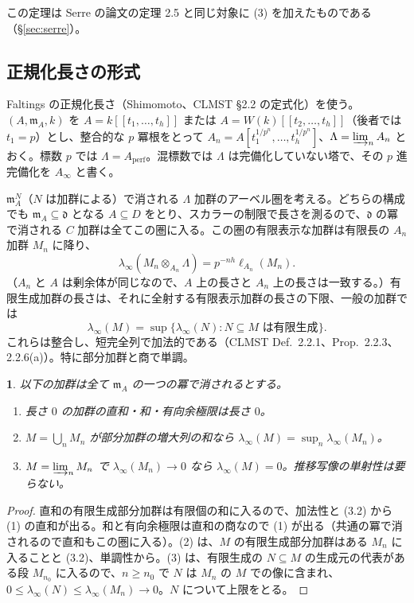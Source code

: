 \documentclass[11pt,a4paper]{ltjsarticle}
\newcommand{\stmtname}{}
\theoremstyle{plain}
\newtheorem*{stmtgen}{\stmtname}
\newenvironment{stmt}[1]{\renewcommand{\stmtname}{#1}\begin{stmtgen}}{\end{stmtgen}}
\theoremstyle{definition}
\newcommand{\m}{\mathfrak{m}}
\newcommand{\dd}{\mathfrak{d}}
\newcommand{\perf}{\mathrm{perf}}
\begin{document}
この定理は Serre の論文の定理 2.5 と同じ対象に (3) を加えたものである（\S\ref{sec:serre}）。

\subsection{正規化長さの形式}
Faltings の正規化長さ（Shimomoto、CLMST \S2.2 の定式化）を使う。$(A,\m_A,k)$ を
$A = k[[t_1,\dots,t_h]]$ または $A = W(k)[[t_2,\dots,t_h]]$（後者では $t_1 = p$）とし、整合的な $p$ 冪根をとって
$A_n = A[t_1^{1/p^n},\dots,t_h^{1/p^n}]$、$\Lambda = \varinjlim_nA_n$
とおく。標数 $p$ では $\Lambda = A_{\perf}$。混標数では $\Lambda$ は完備化していない塔で、その $p$ 進完備化を $A_\infty$ と書く。

$\m_A^N$（$N$ は加群による）で消される $\Lambda$ 加群のアーベル圏を考える。どちらの構成でも $\m_A\subseteq\dd$ となる $A\subseteq D$ をとり、スカラーの制限で長さを測るので、$\dd$ の冪で消される $C$ 加群は全てこの圏に入る。この圏の有限表示な加群は有限長の $A_n$ 加群 $M_n$ に降り、
\begin{equation}\tag{3.1}
  \lambda_\infty(M_n\otimes_{A_n}\Lambda) = p^{-nh}\ell_{A_n}(M_n).
\end{equation}
（$A_n$ と $A$ は剰余体が同じなので、$A$ 上の長さと $A_n$ 上の長さは一致する。）有限生成加群の長さは、それに全射する有限表示加群の長さの下限、一般の加群では
\begin{equation}\tag{3.2}
  \lambda_\infty(M) = \sup\{\lambda_\infty(N): N\subseteq M\text{ は有限生成}\}.
\end{equation}
これらは整合し、短完全列で加法的である（CLMST Def.~2.2.1、Prop.~2.2.3、2.2.6(a)）。特に部分加群と商で単調。

\begin{stmt}{補題 3.2}
以下の加群は全て $\m_A$ の一つの冪で消されるとする。
\begin{enumerate}
  \item 長さ $0$ の加群の直和・和・有向余極限は長さ $0$。
  \item $M = \bigcup_nM_n$ が部分加群の増大列の和なら $\lambda_\infty(M) = \sup_n\lambda_\infty(M_n)$。
  \item $M = \varinjlim_nM_n$ で $\lambda_\infty(M_n)\to0$ なら $\lambda_\infty(M) = 0$。推移写像の単射性は要らない。
\end{enumerate}
\end{stmt}
\begin{proof}
直和の有限生成部分加群は有限個の和に入るので、加法性と (3.2) から (1) の直和が出る。和と有向余極限は直和の商なので (1) が出る（共通の冪で消されるので直和もこの圏に入る）。(2) は、$M$ の有限生成部分加群はある $M_n$ に入ることと (3.2)、単調性から。(3) は、有限生成の $N\subseteq M$ の生成元の代表がある段 $M_{n_0}$ に入るので、$n\ge n_0$ で $N$ は $M_n$ の $M$ での像に含まれ、$0\le\lambda_\infty(N)\le\lambda_\infty(M_n)\to0$。$N$ について上限をとる。
\end{proof}
\end{document}
